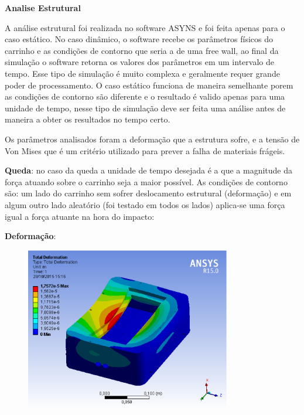 \textbf{Analise Estrutural}

A análise estrutural foi realizada no software ASYNS e foi feita apenas para o caso estático. No caso dinâmico, o software recebe os
parâmetros físicos do carrinho e as condições de contorno que seria a de uma free wall, ao final da simulação o software retorna os
valores dos parâmetros em um intervalo de tempo. Esse tipo de simulação é muito complexa e geralmente requer grande poder de processamento.
O caso estático funciona de maneira semelhante porem as condições de contorno são diferente e o resultado é valido apenas para uma
unidade de tempo, nesse tipo de simulação deve ser feita uma análise antes de maneira a obter os resultados no tempo certo.

Os parâmetros analisados foram a deformação que a estrutura sofre, e a tensão de Von Mises que é um critério utilizado para prever a
falha de materiais frágeis.

\textbf{Queda}: no caso da queda a unidade de tempo desejada é a que a magnitude da força atuando sobre o carrinho seja a maior possível.
As condições de contorno são: um lado do carrinho sem sofrer deslocamento estrutural (deformação) e em algum outro lado aleatório
(foi testado em todos os lados) aplica-se uma força igual a força atuante na hora do impacto:

\textbf{Deformação}:

\begin{figure}[H]
    \centering
    \includegraphics[width=0.8\textwidth]{figuras/deformacao_1000n.eps}
    \caption{}
    \label{fig:def1000}
\end{figure}

